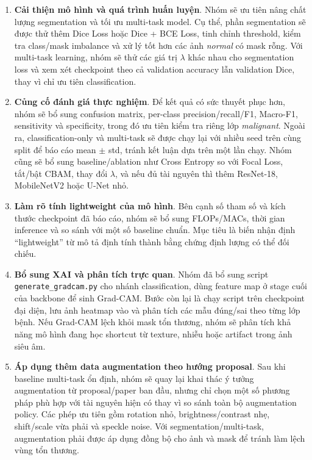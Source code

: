 \documentclass[12pt,a4paper]{article}
\begin{document}
\begin{enumerate}[label=\textbf{G\arabic*.}]
    \item \textbf{Cải thiện mô hình và quá trình huấn luyện}. Nhóm sẽ ưu tiên nâng chất lượng segmentation và tối ưu multi-task model. Cụ thể, phần segmentation sẽ được thử thêm Dice Loss hoặc Dice + BCE Loss, tinh chỉnh threshold, kiểm tra class/mask imbalance và xử lý tốt hơn các ảnh \textit{normal} có mask rỗng. Với multi-task learning, nhóm sẽ thử các giá trị \(\lambda\) khác nhau cho segmentation loss và xem xét checkpoint theo cả validation accuracy lẫn validation Dice, thay vì chỉ ưu tiên classification.

    \item \textbf{Củng cố đánh giá thực nghiệm}. Để kết quả có sức thuyết phục hơn, nhóm sẽ bổ sung confusion matrix, per-class precision/recall/F1, Macro-F1, sensitivity và specificity, trong đó ưu tiên kiểm tra riêng lớp \textit{malignant}. Ngoài ra, classification-only và multi-task sẽ được chạy lại với nhiều seed trên cùng split để báo cáo mean \(\pm\) std, tránh kết luận dựa trên một lần chạy. Nhóm cũng sẽ bổ sung baseline/ablation như Cross Entropy so với Focal Loss, tắt/bật CBAM, thay đổi \(\lambda\), và nếu đủ tài nguyên thì thêm ResNet-18, MobileNetV2 hoặc U-Net nhỏ.

    \item \textbf{Làm rõ tính lightweight của mô hình}. Bên cạnh số tham số và kích thước checkpoint đã báo cáo, nhóm sẽ bổ sung FLOPs/MACs, thời gian inference và so sánh với một số baseline chuẩn. Mục tiêu là biến nhận định ``lightweight'' từ mô tả định tính thành bằng chứng định lượng có thể đối chiếu.

    \item \textbf{Bổ sung XAI và phân tích trực quan}. Nhóm đã bổ sung script \texttt{generate\_gradcam.py} cho nhánh classification, dùng feature map ở stage cuối của backbone để sinh Grad-CAM. Bước còn lại là chạy script trên checkpoint đại diện, lưu ảnh heatmap vào  và phân tích các mẫu đúng/sai theo từng lớp bệnh. Nếu Grad-CAM lệch khỏi mask tổn thương, nhóm sẽ phân tích khả năng mô hình đang học shortcut từ texture, nhiễu hoặc artifact trong ảnh siêu âm.

    \item \textbf{Áp dụng thêm data augmentation theo hướng proposal}. Sau khi baseline multi-task ổn định, nhóm sẽ quay lại khai thác ý tưởng augmentation từ proposal/paper ban đầu, nhưng chỉ chọn một số phương pháp phù hợp với tài nguyên hiện có thay vì so sánh toàn bộ augmentation policy. Các phép ưu tiên gồm rotation nhỏ, brightness/contrast nhẹ, shift/scale vừa phải và speckle noise. Với segmentation/multi-task, augmentation phải được áp dụng đồng bộ cho ảnh và mask để tránh làm lệch vùng tổn thương.
\end{enumerate}
\end{document}
